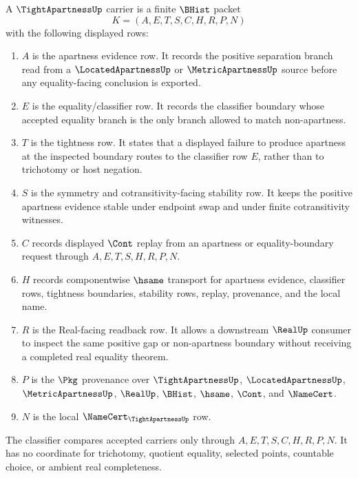 \begin{definition}
\label{def:tight-apartness-carrier}
A $\TightApartnessUp$ carrier is a finite $\BHist$ packet
$$
K=(A,E,T,S,C,H,R,P,N)
$$
with the following displayed rows:
\begin{enumerate}
\item $A$ is the apartness evidence row. It records the positive separation branch read from a $\LocatedApartnessUp$ or $\MetricApartnessUp$ source before any equality-facing conclusion is exported.
\item $E$ is the equality/classifier row. It records the classifier boundary whose accepted equality branch is the only branch allowed to match non-apartness.
\item $T$ is the tightness row. It states that a displayed failure to produce apartness at the inspected boundary routes to the classifier row $E$, rather than to trichotomy or host negation.
\item $S$ is the symmetry and cotransitivity-facing stability row. It keeps the positive apartness evidence stable under endpoint swap and under finite cotransitivity witnesses.
\item $C$ records displayed $\Cont$ replay from an apartness or equality-boundary request through $A,E,T,S,H,R,P,N$.
\item $H$ records componentwise $\hsame$ transport for apartness evidence, classifier rows, tightness boundaries, stability rows, replay, provenance, and the local name.
\item $R$ is the Real-facing readback row. It allows a downstream $\RealUp$ consumer to inspect the same positive gap or non-apartness boundary without receiving a completed real equality theorem.
\item $P$ is the $\Pkg$ provenance over $\TightApartnessUp$, $\LocatedApartnessUp$, $\MetricApartnessUp$, $\RealUp$, $\BHist$, $\hsame$, $\Cont$, and $\NameCert$.
\item $N$ is the local $\NameCert_{\TightApartnessUp}$ row.
\end{enumerate}
The classifier compares accepted carriers only through $A,E,T,S,C,H,R,P,N$. It has no coordinate for trichotomy, quotient equality, selected points, countable choice, or ambient real completeness.
\end{definition}

